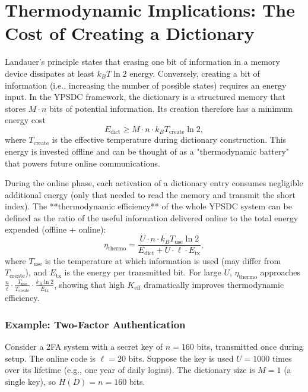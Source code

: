 \documentclass[12pt,a4paper]{article}
\theoremstyle{remark}
\newcommand{\Keff}{K_{\mathrm{eff}}}
\begin{document}
	\section{Thermodynamic Implications: The Cost of Creating a Dictionary}
	\label{sec:thermo}
	
	Landauer's principle \cite{Landauer1961} states that erasing one bit of information in a memory device dissipates at least $k_B T \ln 2$ energy. Conversely, creating a bit of information (i.e., increasing the number of possible states) requires an energy input. In the YPSDC framework, the dictionary is a structured memory that stores $M \cdot n$ bits of potential information. Its creation therefore has a minimum energy cost
	\begin{equation}
		E_{\text{dict}} \ge M \cdot n \cdot k_B T_{\text{create}} \ln 2, \label{eq:thermo-cost}
	\end{equation}
	where $T_{\text{create}}$ is the effective temperature during dictionary construction. This energy is invested offline and can be thought of as a "thermodynamic battery" that powers future online communications.
	
	During the online phase, each activation of a dictionary entry consumes negligible additional energy (only that needed to read the memory and transmit the short index). The **thermodynamic efficiency** of the whole YPSDC system can be defined as the ratio of the useful information delivered online to the total energy expended (offline + online):
	\begin{equation}
		\eta_{\text{thermo}} = \frac{U \cdot n \cdot k_B T_{\text{use}} \ln 2}{E_{\text{dict}} + U \cdot \ell \cdot E_{\text{tx}}}, \label{eq:thermo}
	\end{equation}
	where $T_{\text{use}}$ is the temperature at which information is used (may differ from $T_{\text{create}}$), and $E_{\text{tx}}$ is the energy per transmitted bit. For large $U$, $\eta_{\text{thermo}}$ approaches $\frac{n}{\ell} \cdot \frac{T_{\text{use}}}{T_{\text{create}}} \cdot \frac{k_B \ln 2}{E_{\text{tx}}}$, showing that high $\Keff$ dramatically improves thermodynamic efficiency.
	
	\subsubsection{Example: Two-Factor Authentication}
	Consider a 2FA system with a secret key of $n = 160$ bits, transmitted once during setup. The online code is $\ell = 20$ bits. Suppose the key is used $U = 1000$ times over its lifetime (e.g., one year of daily logins). The dictionary size is $M = 1$ (a single key), so $H(D) = n = 160$ bits.
	
\end{document}
